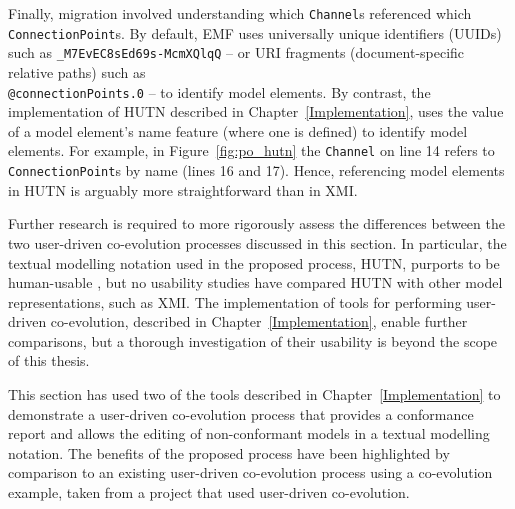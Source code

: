 Finally, migration involved understanding which \texttt{Ch\-an\-n\-el}s referenced which \texttt{Co\-nn\-ec\-ti\-onPo\-in\-t}s.  By default, EMF uses universally unique identifiers (UUIDs) such as \texttt{\_M7EvEC8sEd69s-McmXQlqQ} -- or URI fragments (document-specific relative paths) such as \texttt{\\@co\-nn\-ec\-ti\-onPo\-in\-ts.0} -- to identify model elements. By contrast, the implementation of HUTN described in Chapter~\ref{Implementation}, uses the value of a model element's name feature (where one is defined) to identify model elements. For example, in Figure~\ref{fig:po_hutn} the \texttt{Ch\-an\-n\-el} on line 14 refers to \texttt{Co\-nn\-ec\-ti\-onPo\-in\-t}s by name (lines 16 and 17). Hence, referencing model elements in HUTN is arguably more straightforward than in XMI.

Further research is required to more rigorously assess the differences between the two user-driven co-evolution processes discussed in this section. In particular, the textual modelling notation used in the proposed process, HUTN, purports to be human-usable \cite{hutn}, but no usability studies have compared HUTN with other model representations, such as XMI. The implementation of tools for performing user-driven co-evolution, described in Chapter~\ref{Implementation}, enable further comparisons, but a thorough investigation of their usability is beyond the scope of this thesis.

This section has used two of the tools described in Chapter~\ref{Implementation} to demonstrate a user-driven co-evolution process that provides a conformance report and allows the editing of non-conformant models in a textual modelling notation. The benefits of the proposed process have been highlighted by comparison to an existing user-driven co-evolution process using a co-evolution example, taken from a project that used user-driven co-evolution.